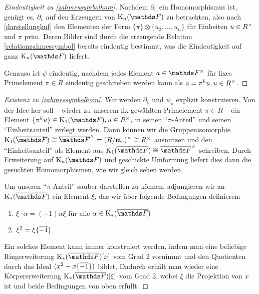 \documentclass[ngerman,fontsize=11pt, paper=a4, parskip=half, titlepage=true, toc=bib]{scrartcl}
\begin{document}
\begin{proof}[Eindeutigkeit zu \ref{zahmessymbolhom}]
  Nachdem $\partial_v$ ein Homomorphismus ist, genügt es, $\partial_v$ auf
  den Erzeugern von $\KnF$ zu betrachten, also nach \ref{darstellungknf} den
  Elementen der Form $\{\pi\}\otimes\{u_{2},\dotsc,u_{n}\}$ für
  Einheiten $u\in R^\times$ und $\pi$ prim.
  Deren Bilder sind durch die erzeugende Relation 
  \ref{relationzahmessymbol} bereits eindeutig
  bestimmt, was die Eindeutigkeit auf ganz $\KnF$ liefert.
  
  Genauso ist $\psi$ eindeutig, nachdem jedes Element $a\in\Fx$ für
  fixes Primelement $\pi\in R$ eindeutig geschrieben werden kann als
  $a=\pi^k u, u\in R^\times$.
\end{proof}

\begin{proof}[Existenz zu \ref{zahmessymbolhom}]
  Wir werden $\partial_v$ und $\psi_\pi$ explizit konstruieren.
  Von der Idee her soll 
  – wieder zu unserem fix gewählten Primelement $\pi\in R$ – 
  ein Element $\{\pi^ku\}\in\KoF, u\in \Rx,$
  in seinen \enquote{$\pi$-Anteil} und seinen 
  \enquote{Einheitsanteil} zerlegt werden. 
  Dann können wir die Gruppenisomorphie
  $\K_1(\bF)\cong\bFx=(R/\frakm_v)^\times\cong \Rx$
  ausnutzen und den \enquote{Einheitsanteil} als Element aus 
  $\K_1(\bF)\cong \bFx$
  schreiben. Durch Erweiterung auf $\KnF$ und 
  geschickte Umformung liefert dies dann die
  gesuchten Homomorphismen, wie wir gleich sehen werden.
  
  Um unseren \enquote{$\pi$-Anteil} sauber darstellen zu können,
  adjungieren wir an $\KbF$ ein Element $\xi$, das wir über
  folgende Bedingungen definieren:
  \begin{enumerate}[(1)]
  \item $\xi\cdot \alpha=(-1)\alpha\xi$ für alle $\alpha\in\KbF$
  \item $\xi^2=\xi\{\overline{-1}\}$
  \end{enumerate}
  Ein solches Element kann immer konstruiert werden, indem man eine
  beliebige Ringerweiterung $\KbF[x]$ vom Grad 2 vornimmt und den
  Quotienten durch das Ideal $(x^2-x\{\overline{-1}\})$ bildet. Dadurch
  erhält man wieder eine Körpererweiterung $\KbF[\xi]$ vom Grad 2,
  wobei $\xi$ die Projektion von $x$ ist und beide Bedingungen von
  oben erfüllt.
  

\end{proof}
\end{document}
